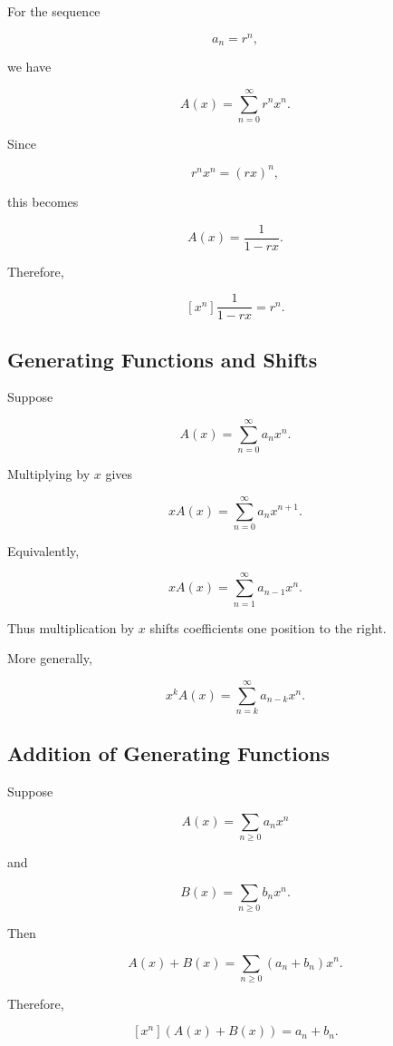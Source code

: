 For the sequence

\[
a_n=r^n,
\]

we have

\[
A(x)
=
\sum_{n=0}^{\infty}r^nx^n.
\]

Since

\[
r^nx^n=(rx)^n,
\]

this becomes

\[
\boxed{
A(x)
=
\frac{1}{1-rx}.
}
\]

Therefore,

\[
\boxed{
[x^n]\frac{1}{1-rx}=r^n.
}
\]

\subsection{Generating Functions and Shifts}
\label{subsec:gf-shifts}

Suppose

\[
A(x)=\sum_{n=0}^{\infty}a_nx^n.
\]

Multiplying by \(x\) gives

\[
xA(x)
=
\sum_{n=0}^{\infty}a_nx^{n+1}.
\]

Equivalently,

\[
xA(x)
=
\sum_{n=1}^{\infty}a_{n-1}x^n.
\]

Thus multiplication by \(x\) shifts coefficients one position to the
right.

More generally,

\[
\boxed{
x^kA(x)
=
\sum_{n=k}^{\infty}a_{n-k}x^n.
}
\]

\subsection{Addition of Generating Functions}
\label{subsec:addition-generating-functions}

Suppose

\[
A(x)
=
\sum_{n\geq0}a_nx^n
\]

and

\[
B(x)
=
\sum_{n\geq0}b_nx^n.
\]

Then

\[
A(x)+B(x)
=
\sum_{n\geq0}(a_n+b_n)x^n.
\]

Therefore,

\[
\boxed{
[x^n](A(x)+B(x))
=
a_n+b_n.
}
\]

